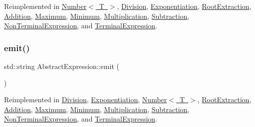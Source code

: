 Reimplemented in \mbox{\hyperlink{class_number_aa43204ac0f0ddcc95f06e32fa0e3fbf1}{Number$<$ T $>$}}, \mbox{\hyperlink{class_division_a3ab537039d60a6464fffaa909536f449}{Division}}, \mbox{\hyperlink{class_exponentiation_ae7f0d75fef03d8121d812c591ba6e43f}{Exponentiation}}, \mbox{\hyperlink{class_root_extraction_aadc4dbcddb8993df4556b08543ab5d3a}{Root\+Extraction}}, \mbox{\hyperlink{class_addition_a2179a99b4b5cfe806c3ef67deac9bed4}{Addition}}, \mbox{\hyperlink{class_maximum_a2a37f1b30773d9c63ab57941f5e89cbe}{Maximum}}, \mbox{\hyperlink{class_minimum_ab234ac7bb36a5e92c72d18f22a94c47a}{Minimum}}, \mbox{\hyperlink{class_multiplication_ad6f64d9672c75a25030af352f855309e}{Multiplication}}, \mbox{\hyperlink{class_subtraction_a0139d9c18eb7d87fc2f30ca4a6ea114e}{Subtraction}}, \mbox{\hyperlink{class_non_terminal_expression_a04d61bbfb066afe1c603396e9e69c397}{Non\+Terminal\+Expression}}, and \mbox{\hyperlink{class_terminal_expression_acc524881ef522ae0cf1231f2cae2b060}{Terminal\+Expression}}.

\mbox{\label{class_abstract_expression_a9f19c05e663491688cdf4423e002a391}} 
\subsubsection{\texorpdfstring{emit()}{emit()}}
{\footnotesize\ttfamily std\+::string Abstract\+Expression\+::emit (\begin{DoxyParamCaption}{ }\end{DoxyParamCaption})\hspace{0.3cm}{\ttfamily [virtual]}}



Reimplemented in \mbox{\hyperlink{class_division_a98e3e9ebf0c3e305ba5d43b245f3815b}{Division}}, \mbox{\hyperlink{class_exponentiation_a3cc7a07711deedbb2bf4125b55b2ef1f}{Exponentiation}}, \mbox{\hyperlink{class_number_a0c848cb3dac5685ab08cc382c272b00a}{Number$<$ T $>$}}, \mbox{\hyperlink{class_root_extraction_a56d0e41c6864824111928192345419d0}{Root\+Extraction}}, \mbox{\hyperlink{class_addition_a16f231380f84d361f2de34ab7d84093a}{Addition}}, \mbox{\hyperlink{class_maximum_ad1f010f3efa2b463a6ab53c8bfaccbb8}{Maximum}}, \mbox{\hyperlink{class_minimum_a8a81bd6a451ad1ad38dd33a85e9d49cc}{Minimum}}, \mbox{\hyperlink{class_multiplication_aa3d4776c71313acdc380b801ecee792b}{Multiplication}}, \mbox{\hyperlink{class_subtraction_a5371fb13392abe0c2b9fb05ca8bc7875}{Subtraction}}, \mbox{\hyperlink{class_non_terminal_expression_affcc5d6e649552b3788661ec9663eb63}{Non\+Terminal\+Expression}}, and \mbox{\hyperlink{class_terminal_expression_ab18820d8216ab5c2d6111c374aa22423}{Terminal\+Expression}}.

